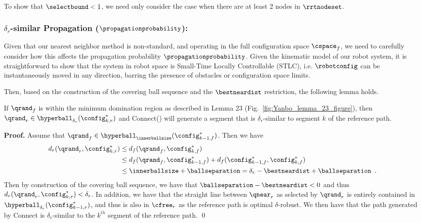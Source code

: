 To show that $\selectbound < 1$, we need only consider the case when there are at least 2 nodes in $\rrtnodeset$.





\subsubsection{$\delta_r$-similar Propagation ($\propagationprobability$):}
\label{sec:prop}
Given that our nearest neighbor method is non-standard, and operating in the full configuration space $\cspace_f$, we need to carefully consider how this affects the propagation probability $\propagationprobability$. Given the kinematic model of our robot system, it is straightforward to show that the system in robot space is Small-Time Locally Controllable (STLC), i.e. $\robotconfig$ can be instantaneously moved in any direction, barring the presence of obstacles or configuration space limits.  

Then, based on the construction of the covering ball sequence and the $\bestneardist$ restriction, the following lemma holds.

\begin{lemma}
    \label{lem:rand_to_next_dist}
    If $\qrand_f$ is within the minimum domination region as described in \cite{LiAOKP2016} Lemma 23 (Fig.~\ref{fig:Yanbo_lemma_23_figure}), then $\qrand_r \in \hyperball_{\delta_r}(\config^*_{k, r})$ and Connect() will generate a segment that is $\delta_r$-similar to segment $k$ of the reference path.
\end{lemma}



\noindent
{\bf Proof.}
Assume that $\qrand_f \in \hyperball_{\innerballsize}(\config^*_{k-1,f})$. Then we have
\begin{align*}
    d_r(\qrand_r, \config^*_{k,r}) &\leq d_f(\qrand_f, \config^*_{k,f}) \\
                                   &\leq d_f(\qrand_f, \config^*_{k-1,f}) + d_f(\config^*_{k-1,f}, \config^*_{k,f}) \\
                                   &\leq \innerballsize + \ballseparation = \delta_r - \bestneardist + \ballseparation \enspace.
\end{align*}
Then by construction of the covering ball sequence, we have that $\ballseparation -\bestneardist < 0$ and thus $d_r(\qrand_r, \config^*_{k,r}) < \delta_r$. In addition, we have that the straight line between $\qnear_r$ as selected by $\qrand_r$ is entirely contained in $\hyperball_{\delta_r}(\config^*_{k-1,r})$, and thus is also in $\cfree_r$ as the reference path is optimal $\delta$-robust. We then have that the path generated by Connect is $\delta_r$-similar to the $k^{th}$ segment of the reference path.
\qed

